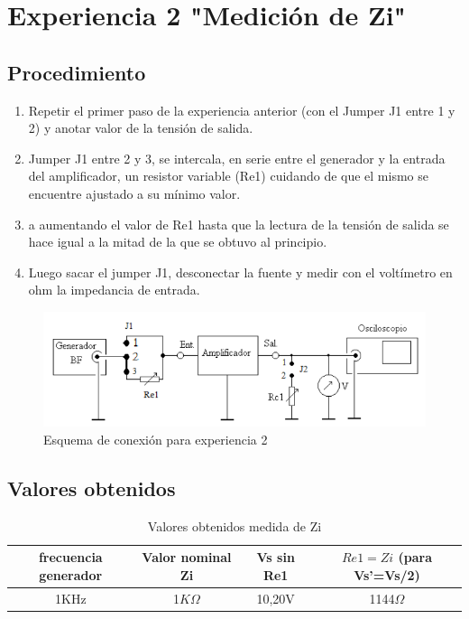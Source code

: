 \documentclass[12pt, letterpaper]{article}
\begin{document}
\section{Experiencia 2 "Medición de Zi"}

\subsection{Procedimiento}
\begin{enumerate}
    \item  Repetir el primer paso de la experiencia anterior (con el Jumper J1 entre 1 y 2)
y anotar  valor de la tensión de salida.
\item  Jumper J1 entre 2 y 3, se intercala, en serie entre el generador y la entrada del amplificador, un resistor variable (Re1) cuidando de que el mismo se encuentre ajustado a su mínimo valor.
\item a aumentando el valor de Re1 hasta que la lectura de la tensión de salida se hace igual a la mitad de la que se obtuvo al principio.
\item Luego sacar el jumper J1, desconectar la fuente y medir con el voltímetro en ohm la impedancia de entrada.
\end{enumerate}

\begin{figure}[H]
	\centering
	\includegraphics{imagenes/esquma_conec_E2.png}
	\caption{Esquema de conexión para experiencia 2}
    \label{fig:con_E2}
\end{figure}

\subsection{Valores obtenidos}

\begin{table}[H]
    \centering
    \caption{Valores obtenidos medida de Zi}
    \begin{tabular}{|c|c|c|c|}\hline
     frecuencia generador  & Valor nominal Zi & Vs sin Re1 & $Re1=Zi$ (para Vs'=Vs/2) \\\hline
     1KHz  & 1$K\Omega$ & 10,20V & 1144$\Omega$   \\ \hline   
    \end{tabular}
    \label{tab:Zi}
\end{table}
\end{document}
